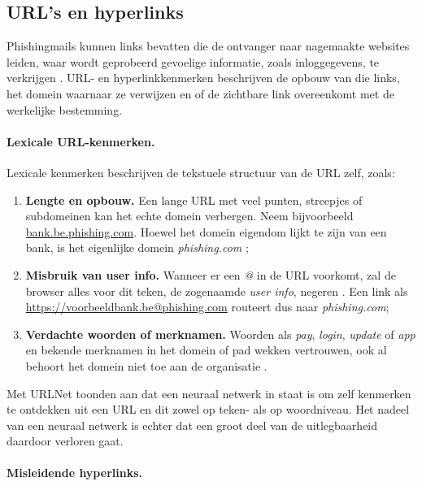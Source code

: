 \subsection{URL's en hyperlinks}%
\label{subsec:urls-hyperlinks}

Phishingmails kunnen links bevatten die de ontvanger naar nagemaakte websites leiden, waar wordt geprobeerd gevoelige informatie, zoals inloggegevens, te verkrijgen \autocite{Varshney2016}.
URL- en hyperlinkkenmerken beschrijven de opbouw van die links, het domein waarnaar ze verwijzen en of de zichtbare link overeenkomt met de werkelijke bestemming.

\paragraph{Lexicale URL-kenmerken.}
Lexicale kenmerken beschrijven de tekstuele structuur van de URL zelf, zoals:
\begin{enumerate}
    \item \textbf{Lengte en opbouw.} Een lange URL met veel punten, streepjes of subdomeinen kan het echte domein verbergen. Neem bijvoorbeeld \url{bank.be.phishing.com}. Hoewel het domein eigendom lijkt te zijn van een bank, is het eigenlijke domein \emph{phishing.com} \autocite{Ma2009};
    \item \textbf{Misbruik van user info.} Wanneer er een \emph{@} in de URL voorkomt, zal de browser alles voor dit teken, de zogenaamde \emph{user info}, negeren \autocite{Berners2005}. Een link als \url{https://voorbeeldbank.be@phishing.com} routeert dus naar \emph{phishing.com};
    \item \textbf{Verdachte woorden of merknamen.} Woorden als \emph{pay}, \emph{login}, \emph{update} of \emph{app} en bekende merknamen in het domein of pad wekken vertrouwen, ook al behoort het domein niet toe aan de organisatie \autocite{Tupsamudre2021}.
\end{enumerate}

Met URLNet toonden \textcite{Le2018} aan dat een neuraal netwerk in staat is om zelf kenmerken te ontdekken uit een URL en dit zowel op teken- als op woordniveau. Het nadeel van een neuraal netwerk is echter dat een groot deel van de uitlegbaarheid daardoor verloren gaat.

\paragraph{Misleidende hyperlinks.}
\label{subsec:urls-hyperlinks:misleidende-hyperlinks}

